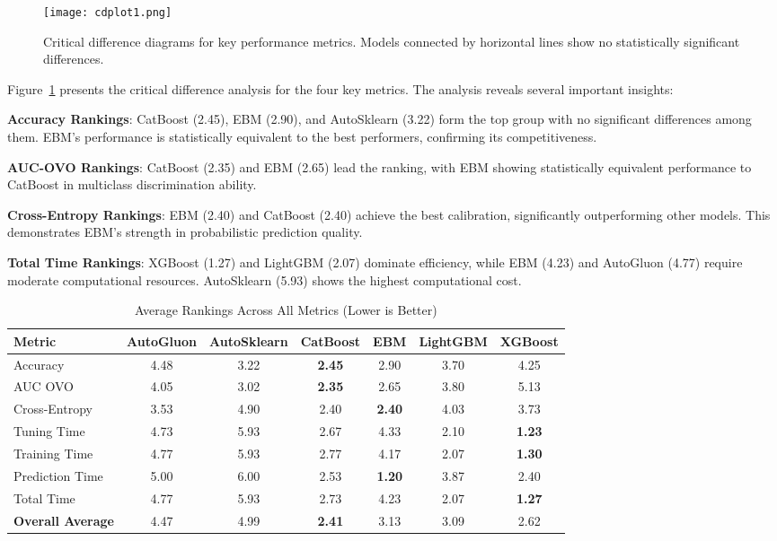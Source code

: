 \documentclass[12pt]{article}
\begin{document}
\begin{figure}[ht]
\centering
\texttt{[image: cdplot1.png]}
\caption{Critical difference diagrams for key performance metrics. Models connected by horizontal lines show no statistically significant differences.}
\label{fig:critical_difference_all}
\end{figure}

Figure~\ref{fig:critical_difference_all} presents the critical difference analysis for the four key metrics. The analysis reveals several important insights:

\textbf{Accuracy Rankings}: CatBoost (2.45), EBM (2.90), and AutoSklearn (3.22) form the top group with no significant differences among them. EBM's performance is statistically equivalent to the best performers, confirming its competitiveness.

\textbf{AUC-OVO Rankings}: CatBoost (2.35) and EBM (2.65) lead the ranking, with EBM showing statistically equivalent performance to CatBoost in multiclass discrimination ability.

\textbf{Cross-Entropy Rankings}: EBM (2.40) and CatBoost (2.40) achieve the best calibration, significantly outperforming other models. This demonstrates EBM's strength in probabilistic prediction quality.

\textbf{Total Time Rankings}: XGBoost (1.27) and LightGBM (2.07) dominate efficiency, while EBM (4.23) and AutoGluon (4.77) require moderate computational resources. AutoSklearn (5.93) shows the highest computational cost.

\begin{table}[H]
\centering
\caption{Average Rankings Across All Metrics (Lower is Better)}
\label{tab:rank_summary}
\begin{tabular}{@{}lcccccc@{}}
\toprule
Metric & AutoGluon & AutoSklearn & CatBoost & EBM & LightGBM & XGBoost \\
\midrule
Accuracy & 4.48 & 3.22 & \textbf{2.45} & 2.90 & 3.70 & 4.25 \\
AUC OVO & 4.05 & 3.02 & \textbf{2.35} & 2.65 & 3.80 & 5.13 \\
Cross-Entropy & 3.53 & 4.90 & 2.40 & \textbf{2.40} & 4.03 & 3.73 \\
Tuning Time & 4.73 & 5.93 & 2.67 & 4.33 & 2.10 & \textbf{1.23} \\
Training Time & 4.77 & 5.93 & 2.77 & 4.17 & 2.07 & \textbf{1.30} \\
Prediction Time & 5.00 & 6.00 & 2.53 & \textbf{1.20} & 3.87 & 2.40 \\
Total Time & 4.77 & 5.93 & 2.73 & 4.23 & 2.07 & \textbf{1.27} \\
\midrule
\textbf{Overall Average} & 4.47 & 4.99 & \textbf{2.41} & 3.13 & 3.09 & 2.62 \\
\bottomrule
\end{tabular}
\end{table}
\end{document}
